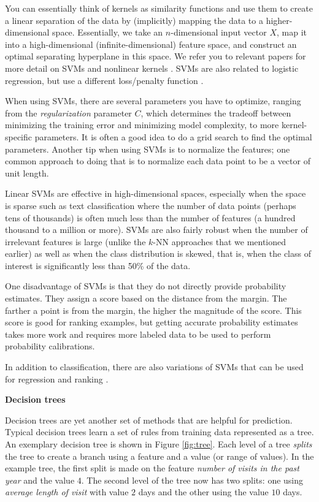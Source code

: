 \documentclass[]{krantz}
\begin{document}
You can essentially think of kernels as similarity functions and use
them to create a linear separation of the data by (implicitly) mapping
the data to a higher-dimensional space. Essentially, we take an
\(n\)-dimensional input vector \(X\), map it into a high-dimensional
(infinite-dimensional) feature space, and construct an optimal
separating hyperplane in this space. We refer you to relevant papers for
more detail on SVMs and nonlinear kernels
\citep{ShaweTaylor2004, Scholkopf2001}. SVMs are also related to
logistic regression, but use a different loss/penalty function
\citep{HastieTibshirani}.

When using SVMs, there are several parameters you have to optimize,
ranging from the \emph{regularization} parameter \(C\), which determines
the tradeoff between minimizing the training error and minimizing model
complexity, to more kernel-specific parameters. It is often a good idea
to do a grid search to find the optimal parameters. Another tip when
using SVMs is to normalize the features; one common approach to doing
that is to normalize each data point to be a vector of unit length.

Linear SVMs are effective in high-dimensional spaces, especially when
the space is sparse such as text classification where the number of data
points (perhaps tens of thousands) is often much less than the number of
features (a hundred thousand to a million or more). SVMs are also fairly
robust when the number of irrelevant features is large (unlike the
\(k\)-NN approaches that we mentioned earlier) as well as when the class
distribution is skewed, that is, when the class of interest is
significantly less than 50\% of the data.

One disadvantage of SVMs is that they do not directly provide
probability estimates. They assign a score based on the distance from
the margin. The farther a point is from the margin, the higher the
magnitude of the score. This score is good for ranking examples, but
getting accurate probability estimates takes more work and requires more
labeled data to be used to perform probability calibrations.

In addition to classification, there are also variations of SVMs that
can be used for regression \citep{SmolaRegression04} and ranking
\citep{Chapelle2010}.

\textbf{Decision trees}

Decision trees are yet another set of methods that are helpful for
prediction. Typical decision trees learn a set of rules from training
data represented as a tree. An exemplary decision tree is shown in
Figure \ref{fig:tree}. Each level of a tree \emph{splits} the tree to
create a branch using a feature and a value (or range of values). In the
example tree, the first split is made on the feature \emph{number of
visits in the past year} and the value \(4\). The second level of the
tree now has two splits: one using \emph{average length of visit} with
value \(2\) days and the other using the value \(10\) days.
\end{document}
